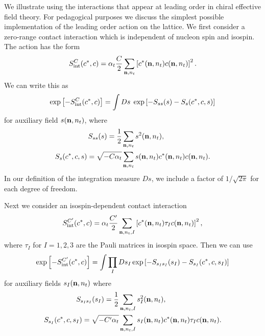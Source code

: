 We illustrate using the interactions that appear at leading order in
chiral effective field theory.  For pedagogical purposes we discuss the simplest possible implementation of the leading order action on the lattice.  We first consider a zero-range contact interaction
which is independent of
nucleon spin and isospin.
The action has the form 
\begin{equation}
S^{C}_\text{int}(c^{\ast},c) = \alpha_{t}\frac{C}{2} \sum_{{\bf n},n_t} \left[c^{\ast}({\bf
n},n_t)c({\bf n},n_t)\right]^2.
\end{equation}
We can write this as
\begin{equation}
\exp\left[-S^C_{\rm int}(c^*,c)\right] = \int Ds \; \exp\left[-S_{ss}(s)
- S_{s}(c^*,c,s)\right]
\label{aux}
\end{equation}
for auxiliary field $s({\bf n},n_t)$, 
where
\begin{align}
S_{ss}(s) = \frac{1}{2} & \sum_{{\bf n},n_t} s^{2}({\bf n},n_t),
 \\
S_{s}(c^*,c,s) =  \sqrt{-C\alpha_{t}} & \sum_{{\bf n},n_t} s({\bf n},n_t)c^{\ast}({\bf
n},n_t)c({\bf n},n_t).  
\end{align}
In our definition of the integration measure $Ds$, we include a factor of
$1/\sqrt{2\pi}$ for each degree of freedom.

Next we consider an isospin-dependent contact interaction 
\begin{equation}
S^{C'}_\text{int}(c^{\ast},c) = \alpha_{t}\frac{C'}{2} \sum_{{\bf n},n_t,I}
\left[c^{\ast}({\bf
n},n_t)\tau_I c({\bf n},n_t)\right]^2,
\end{equation}
where $\tau_I$ for $I=1,2,3$ are the Pauli matrices in isospin space.  Then
we can use
\begin{equation}
\exp\left[-S^{C'}_{\rm int}(c^*,c)\right] = \int \prod_I Ds_I \exp\left[-S_{s_Is_I}(s_I)
- S_{s_I}(c^*,c,s_{I})\right]
\label{aux2}
\end{equation}
for auxiliary fields $s_I({\bf n},n_t)$ where
\begin{align}
S_{s_Is_I}(s_I)=\frac{1}{2} & \sum_{{\bf n},n_t,I} s_I^{2}({\bf n},n_t),
\\
S_{s_I}(c^*,c,s_{I}) = \sqrt{-C'\alpha_{t}} & \sum_{{\bf n},n_t,I} s_{I}({\bf
n},n_t)c^{\ast}({\bf
n},n_t)\tau_Ic({\bf n},n_t).  
\end{align}

